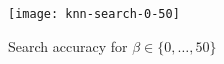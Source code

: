 \begin{figure}[h]
	\centering
	\texttt{[image: knn-search-0-50]} %
	\caption{Search accuracy for $\beta \in \{ 0, \ldots, 50 \}$}\label{figure:knn-search-coarse}
\end{figure}
